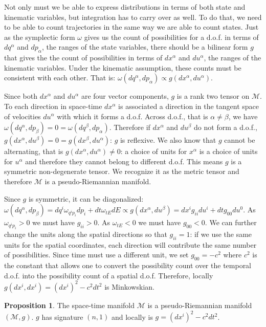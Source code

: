\documentclass[smallextended]{svjour3}
\numberwithin{equation}{section}
\theoremstyle{definition}
\newtheorem{prop}[equation]{Proposition}
\begin{document}
Not only must we be able to express distributions in terms of both state and kinematic variables, but integration has to carry over as well. To do that, we need to be able to count trajectories in the same way we are able to count states. Just as the symplectic form $\omega$ gives us the count of possibilities for a d.o.f. in terms of $dq^\alpha$ and $dp_\alpha$, the ranges of the state variables, there should be a bilinear form $g$ that gives the the count of possibilities in terms of $dx^\alpha$ and $du^\alpha$, the ranges of the kinematic variables. Under the kinematic assumption, these counts must be consistent with each other. That is: $\omega(dq^\alpha,dp_\alpha) \propto g(dx^\alpha,du^\alpha)$.

Since both $dx^\alpha$ and $du^\alpha$ are four vector components, $g$ is a rank two tensor on $\mathcal{M}$. To each direction in space-time $dx^\alpha$ is associated a direction in the tangent space of velocities $du^\alpha$ with which it forms a d.o.f. Across d.o.f., that is $\alpha \neq \beta$, we have $\omega(dq^\alpha, dp_\beta) = 0 =\omega(dq^\beta, dp_\alpha)$. Therefore if $dx^\alpha$ and $du^\beta$ do not form a d.o.f., $g(dx^\alpha, du^\beta) = 0 = g(dx^\beta, du^\alpha)$: $g$ is reflexive. We also know that $g$ cannot be alternating, that is $g(dx^\alpha, du^\alpha) \neq 0$: a choice of units for $x^\alpha$ is a choice of units for $u^\alpha$ and therefore they cannot belong to different d.o.f. This means $g$ is a symmetric non-degenerate tensor. We recognize it as the metric tensor and therefore $\mathcal{M}$ is a pseudo-Riemannian manifold.

Since $g$ is symmetric, it can be diagonalized: $\omega(dq^\alpha, dp_\beta)= dq^i \omega_{q^ip_i} dp_i + dt \omega_{tE} dE \propto g(dx^\alpha, du^\beta) = dx^i g_{ii} du^i + dt g_{00} du^0$. As $\omega_{q^ip_i} > 0$ we must have $g_{ii} > 0$. As $\omega_{tE} < 0$ we must have $g_{00} < 0$. We can further change the units along the spatial directions so that $g_{ii}=1$: if we use the same units for the spatial coordinates, each direction will contribute the same number of possibilities. Since time must use a different unit, we set $g_{00}=-c^2$ where $c^2$ is the constant that allows one to convert the possibility count over the temporal d.o.f. into the possibility count of a spatial d.o.f. Therefore, locally $g(dx^i, dx^i) = (dx^i)^2 - c^2 dt^2$ is Minkowskian.

\begin{prop}\label{prop:riemannian_manifold}
	The space-time manifold $\mathcal{M}$ is a pseudo-Riemannian manifold $(\mathcal{M}, g)$. $g$ has signature $(n,1)$ and locally is $g = (dx^i)^2 - c^2 dt^2$.
\end{prop}
\end{document}
